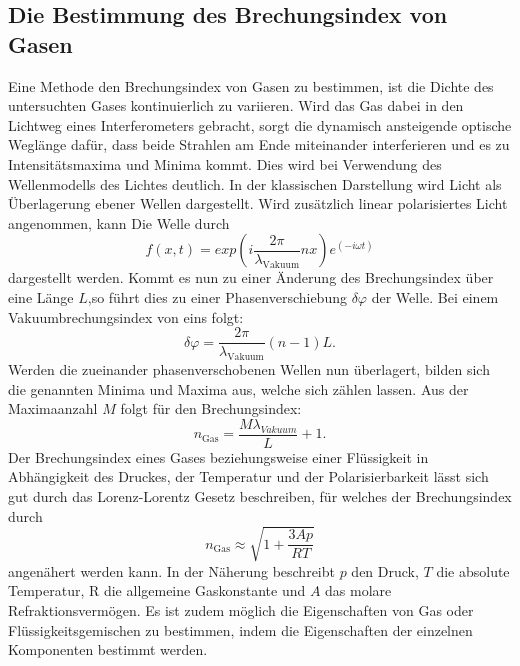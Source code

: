  \subsection{Die Bestimmung des Brechungsindex von Gasen}
 Eine Methode den Brechungsindex von Gasen zu bestimmen, ist die Dichte des untersuchten Gases kontinuierlich zu variieren. Wird das Gas dabei in den Lichtweg eines Interferometers gebracht, sorgt die dynamisch ansteigende optische Weglänge dafür, dass beide Strahlen am Ende miteinander interferieren und es zu Intensitätsmaxima und Minima kommt. Dies wird bei Verwendung des Wellenmodells des Lichtes deutlich. 
 In der klassischen Darstellung wird Licht als Überlagerung ebener Wellen dargestellt. Wird zusätzlich linear polarisiertes Licht angenommen, kann Die Welle durch
 \begin{equation}
    f(x,t) = exp(i \frac{2 \pi}{\lambda_\text{Vakuum}} n x ) e^{(-i \omega t)} \label{eq:ebeneWelle}
 \end{equation}
dargestellt werden. Kommt es nun zu einer Änderung des Brechungsindex über eine Länge $L$,so führt dies zu einer Phasenverschiebung $\delta\varphi$ der Welle. Bei einem Vakuumbrechungsindex von eins folgt:
\begin{equation}
    \delta \varphi = \frac{2 \pi}{\lambda_\text{Vakuum}} (n-1) L \text{.} \label{eq:Deltaphi}
\end{equation}
Werden die zueinander phasenverschobenen Wellen nun überlagert, bilden sich die genannten Minima und Maxima aus, welche sich zählen lassen. Aus der Maximaanzahl $M$ folgt für den Brechungsindex:
\begin{equation}
	n_\text{Gas} = \frac{M  \lambda_{Vakuum}}{L} +1 \text{.} \label{eq:nGas}
\end{equation} 
Der Brechungsindex eines Gases beziehungsweise einer Flüssigkeit in Abhängigkeit des Druckes, der Temperatur und der Polarisierbarkeit lässt sich gut durch das Lorenz-Lorentz Gesetz beschreiben, für welches der Brechungsindex durch 
\begin{equation}
n_\text{Gas} \approx \sqrt{1+\frac{3 A p}{R T}} \label{eq:lorenz}
\end{equation}
angenähert werden kann. In der Näherung beschreibt $p$ den Druck, $T$ die absolute Temperatur, R die allgemeine Gaskonstante und $A$ das molare Refraktionsvermögen. Es ist zudem möglich die Eigenschaften von Gas oder Flüssigkeitsgemischen zu bestimmen, indem die Eigenschaften der einzelnen Komponenten bestimmt werden.

